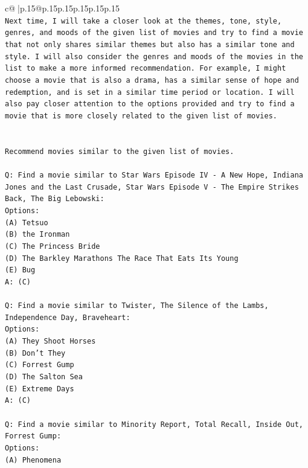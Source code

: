 \documentclass{article}
\begin{document}
{\begin{supertabular}{c@{$\;$}|p{.15\linewidth}@{}p{.15\linewidth}p{.15\linewidth}p{.15\linewidth}p{.15\linewidth}p{.15\linewidth}}
{{{\\ 
\texttt{Next time, I will take a closer look at the themes, tone, style, genres, and moods of the given list of movies and try to find a movie that not only shares similar themes but also has a similar tone and style. I will also consider the genres and moods of the movies in the list to make a more informed recommendation. For example, I might choose a movie that is also a drama, has a similar sense of hope and redemption, and is set in a similar time period or location. I will also pay closer attention to the options provided and try to find a movie that is more closely related to the given list of movies.} \\
\\ 
\\ 
\texttt{Recommend movies similar to the given list of movies.} \\
\\ 
\texttt{Q: Find a movie similar to Star Wars Episode IV {-} A New Hope, Indiana Jones and the Last Crusade, Star Wars Episode V {-} The Empire Strikes Back, The Big Lebowski:} \\
\texttt{Options:} \\
\texttt{(A) Tetsuo} \\
\texttt{(B) the Ironman} \\
\texttt{(C) The Princess Bride} \\
\texttt{(D) The Barkley Marathons The Race That Eats Its Young} \\
\texttt{(E) Bug} \\
\texttt{A: (C)} \\
\\ 
\texttt{Q: Find a movie similar to Twister, The Silence of the Lambs, Independence Day, Braveheart:} \\
\texttt{Options:} \\
\texttt{(A) They Shoot Horses} \\
\texttt{(B) Don't They} \\
\texttt{(C) Forrest Gump} \\
\texttt{(D) The Salton Sea} \\
\texttt{(E) Extreme Days} \\
\texttt{A: (C)} \\
\\ 
\texttt{Q: Find a movie similar to Minority Report, Total Recall, Inside Out, Forrest Gump:} \\
\texttt{Options:} \\
\texttt{(A) Phenomena} \\
}}}
\end{supertabular}}
\end{document}
